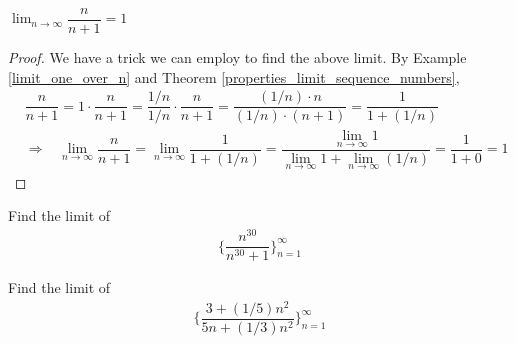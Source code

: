 \begin{example}
$\lim_{n \longrightarrow \infty} \dfrac{n}{n+1} = 1$
\begin{proof}
We have a trick we can employ to find the above limit. By Example \ref{limit_one_over_n} and Theorem \ref{properties_limit_sequence_numbers},
\begin{align*}
    &\dfrac{n}{n+1} = 1 \cdot \dfrac{n}{n+1}
    = \dfrac{1/n}{1/n} \cdot \dfrac{n}{n+1}
    = \dfrac{(1/n) \cdot n}{(1/n) \cdot (n+1)}
    = \dfrac{1}{1 + (1/n)}\\[2ex]
    &\Longrightarrow \hspace{10pt} \lim_{n \longrightarrow \infty} \dfrac{n}{n+1}
    = \lim_{n \longrightarrow \infty} \dfrac{1}{1+(1/n)}
    = \dfrac{\lim_{n \longrightarrow \infty}1}{\lim_{n \longrightarrow \infty}1 + \lim_{n \longrightarrow \infty}(1/n)}
    = \dfrac{1}{1 + 0} = 1
\end{align*}
\end{proof}
\end{example}

\begin{exercise}
Find the limit of 
\begin{align*}
    \Big\{\dfrac{n^{30}}{n^{30}+1}\Big\}_{n=1}^{\infty}
\end{align*}
\end{exercise}

\begin{exercise}
Find the limit of 
\begin{align*}
    \Big\{\dfrac{3+(1/5)n^{2}}{5n+(1/3)n^{2}}\Big\}_{n=1}^{\infty}
\end{align*}
\end{exercise}

